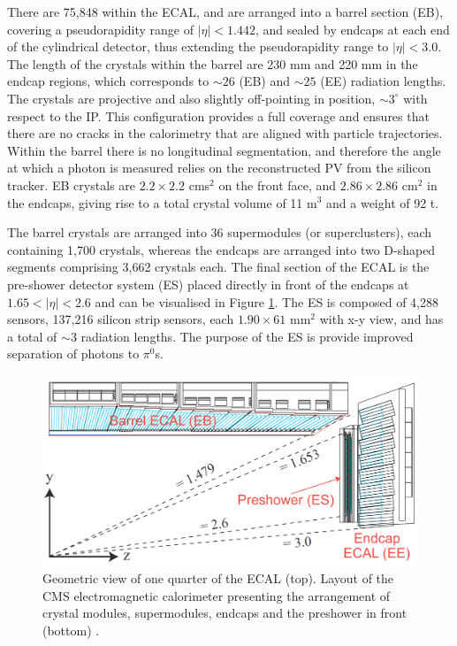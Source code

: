 There are 75,848 within the ECAL, and are arranged into a barrel section (EB), covering a pseudorapidity range of $|\eta|<1.442$, and sealed by endcaps at each end of the cylindrical detector, thus extending the pseudorapidity range to $|\eta|<3.0$. The length of the crystals within the barrel are 230 mm and 220 mm in the endcap regions, which corresponds to $\sim26$ (EB) and $\sim25$ (EE) radiation lengths. The crystals are projective and also slightly off-pointing in position, $\sim3^\circ$ with respect to the IP. This configuration provides a full coverage and ensures that there are no cracks in the calorimetry that are aligned with particle trajectories. Within the barrel there is no longitudinal segmentation, and therefore the angle at which a photon is measured relies on the reconstructed PV from the silicon tracker. EB crystals are $2.2\times2.2$ cms$^2$ on the front face, and $2.86\times2.86$ cm$^2$ in the endcaps, giving rise to a total crystal volume of 11 m$^3$ and a weight of 92 t.

The barrel crystals are arranged into 36 supermodules (or superclusters), each containing 1,700 crystals, whereas the endcaps are arranged into two D-shaped segments comprising 3,662 crystals each. The final section of the ECAL is the pre-shower detector system (ES) placed directly in front of the endcaps at $1.65<|\eta|<2.6$ and can be visualised in Figure \ref{fig-ECALRapidity}. The ES is composed of 4,288 sensors, 137,216 silicon strip sensors, each $1.90\times61$ mm$^2$ with x-y view, and has a total of $\sim3$ radiation lengths. The purpose of the ES is provide improved separation of photons to $\pi^0$s.

\begin{figure}
\includegraphics[width=\textwidth]{Figures/ECALRapidity.png}
\caption{Geometric view of one quarter of the ECAL (top). Layout of the CMS electromagnetic calorimeter presenting the arrangement of crystal modules, supermodules, endcaps and the preshower in front (bottom) \cite{CMSexperiment}.}
\label{fig-ECALRapidity}
\end{figure}

